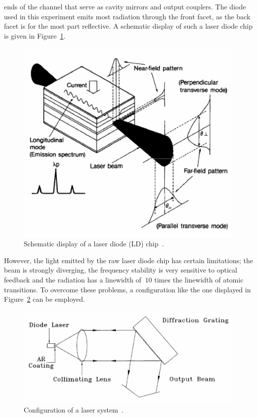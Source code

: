 ends of the channel that serve as cavity mirrors and output couplers. The diode used in this experiment emits most
radiation through the front facet, as the back facet is for the most part reflective. A schematic display of such a
laser diode chip is given in Figure~\ref{fig:diode}.
\begin{figure}[H]
  \centering
  \includegraphics[scale=0.4]{./pictures/Diode-schematisch.png}
 \caption{Schematic display of a laser diode (LD) chip~\cite{teachspin}.}
 \label{fig:diode}
\end{figure}
\noindent
However, the light emitted by the raw laser diode chip has certain limitations; the beam is strongly diverging,
the frequency stability is very sensitive to optical feedback and the radiation has a linewidth of $~10$ times the
linewidth of atomic transitions. To overcome these problems, a configuration like the one displayed in
Figure~\ref{fig:laser-system} can be employed.
\begin{figure}
  \centering
  \includegraphics[scale=0.4]{./pictures/Laser-system.png}
  \caption{Configuration of a laser system~\cite{teachspin}.}
  \label{fig:laser-system}
\end{figure}
\noindent
